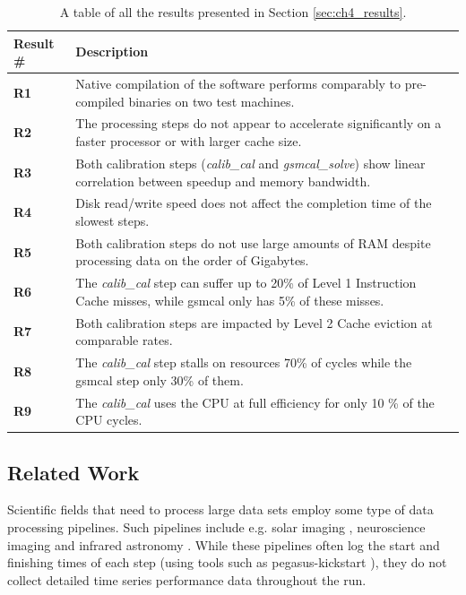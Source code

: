 \begin{table}[!htb]
 \begin{center}
  \begin{tabular}{ l | p{130mm} }
    \hline
    Result \# & Description  \\ \hline
    \hline
    \textbf{R1} & Native compilation of the software performs comparably to pre-compiled binaries on two test machines. \\ \hline
    \textbf{R2} &  The processing steps do not appear to accelerate significantly on a faster processor or with larger cache size. \\ \hline
    \textbf{R3} & Both calibration steps (\textit{calib\_cal} and \textit{gsmcal\_solve}) show linear correlation between speedup and memory bandwidth. \\ \hline
    \textbf{R4} &  Disk read/write speed does not affect the completion time of the slowest steps. \\ \hline
    \textbf{R5} & Both calibration steps do not use large amounts of RAM despite processing data on the order of Gigabytes. \\ \hline
    \textbf{R6} & The \textit{calib\_cal} step can suffer up to 20\% of Level 1 Instruction Cache misses, while gsmcal only has 5\% of these misses. \\ \hline
    \textbf{R7} & Both calibration steps are impacted by Level 2 Cache eviction at comparable rates. \\ \hline
    \textbf{R8} & The \textit{calib\_cal} step stalls on resources 70\% of cycles while the gsmcal step only 30\% of them. \\ \hline
    \textbf{R9} & The \textit{calib\_cal} uses the CPU at full efficiency for only 10 \% of the CPU cycles. \\ \hline
    \hline
  \end{tabular}   
  \caption{A table of all the results presented in Section \ref{sec:ch4_results}.}
  \label{table:ch4_results}
   \end{center}
 \end{table}
 
 
\subsection{Related Work}\label{sec:ch4_related}

Scientific fields that need to process large data sets employ some type of data processing pipelines.  Such pipelines include e.g. solar imaging \citep{solar_pipeline}, neuroscience imaging \citep{optimize_pipeline} and infrared astronomy \citep{herschel}. While these pipelines often log the start and finishing times of each step (using tools such as pegasus-kickstart \citep{kickstart}), they do not collect detailed time series performance data throughout the run. 

